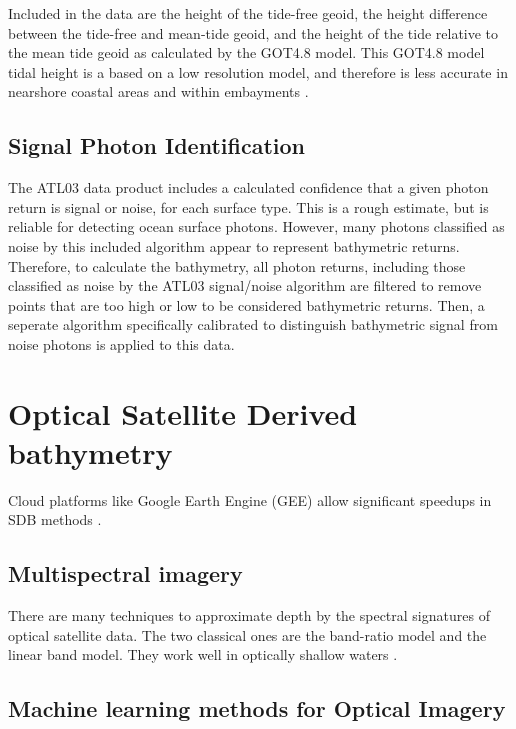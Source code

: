 Included in the data are the height of the tide-free geoid, the height difference between the tide-free and mean-tide geoid, and the height of the tide relative to the mean tide geoid as calculated by the GOT4.8 model. This GOT4.8 model tidal height is a based on a low resolution model, and therefore is less accurate in nearshore coastal areas and within embayments \cite{Neumann2019e}.

\subsection{Signal Photon Identification}

The ATL03 data product includes a calculated confidence that a given photon return is signal or noise, for each surface type. This is a rough estimate, but is reliable for detecting ocean surface photons. However, many photons classified as noise by this included algorithm appear to represent bathymetric returns. Therefore, to calculate the bathymetry, all photon returns, including those classified as noise by the ATL03 signal/noise algorithm are filtered to remove points that are too high or low to be considered bathymetric returns. Then, a seperate algorithm specifically calibrated to distinguish bathymetric signal from noise photons is applied to this data.

\section{Optical Satellite Derived bathymetry}

Cloud platforms like Google Earth Engine (GEE) \cite{Gorelick2017a} allow significant speedups in SDB methods \cite{Pike2019}. 



\subsection{Multispectral imagery}

There are many techniques to approximate depth by the spectral signatures of optical satellite data. The two classical ones are the band-ratio model and the linear band model. They work well in optically shallow waters \cite{Salameh2019}.

\subsection{Machine learning methods for Optical Imagery}

